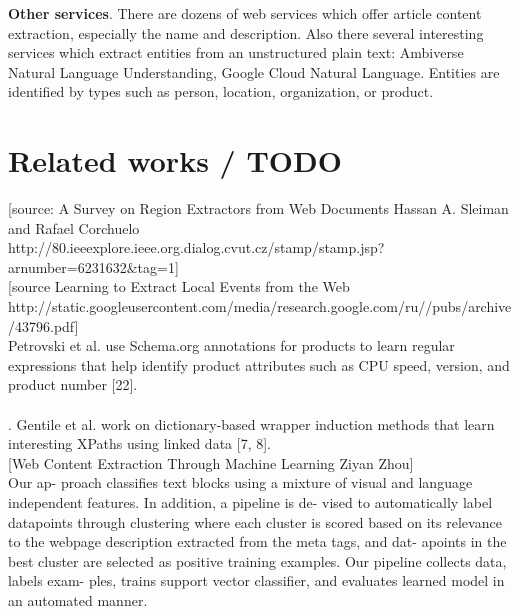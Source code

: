 \noindent\textbf{Other services}. There are dozens of web services which offer article content extraction, especially the name and description. Also there several interesting services which extract entities from an unstructured plain text: Ambiverse Natural Language Understanding, Google Cloud Natural Language. Entities are identified by types such as person, location, organization, or product.\\


\section{Related works / TODO}

[source: A Survey on Region Extractors from Web Documents Hassan A. Sleiman and Rafael Corchuelo http://80.ieeexplore.ieee.org.dialog.cvut.cz/stamp/stamp.jsp?arnumber=6231632&tag=1] \\

[source Learning to Extract Local Events from the Web http://static.googleusercontent.com/media/research.google.com/ru//pubs/archive/43796.pdf] \\

Petrovski et al. use Schema.org annotations
for products to learn regular expressions that help identify
product attributes such as CPU speed, version, and product
number [22]. \\
[22] \\

. Gentile et al. work on dictionary-based wrapper
induction methods that learn interesting XPaths using linked
data [7, 8].\\

[Web Content Extraction Through Machine Learning Ziyan Zhou]\\
Our ap- proach classifies text blocks using a mixture of visual and language independent features. In addition, a pipeline is de- vised to automatically label datapoints through clustering where each cluster is scored based on its relevance to the webpage description extracted from the meta tags, and dat- apoints in the best cluster are selected as positive training examples. Our pipeline collects data, labels exam- ples, trains support vector classifier, and evaluates learned model in an automated manner.\\

